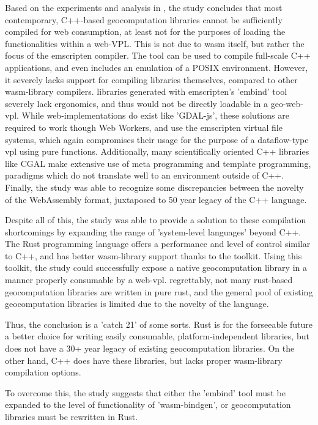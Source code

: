 Based on the experiments and analysis in , the study concludes that most contemporary, C++-based geocomputation libraries cannot be sufficiently compiled for web consumption, at least not for the purposes of loading the functionalities within a web-VPL.    
This is not due to wasm itself, but rather the focus of the emscripten compiler.
The tool can be used to compile full-scale C++ applications, and even includes an emulation of a POSIX environment.
However, it severely lacks support for compiling libraries themselves, compared to other wasm-library compilers.
libraries generated with emscripten's 'embind' tool severely lack ergonomics, and thus would not be directly loadable in a geo-web-vpl.
While web-implementations do exist like 'GDAL-js', these solutions are required to work though Web Workers, and use the emscripten virtual file systems, which again compromises their usage for the purpose of a dataflow-type vpl using pure functions.
Additionally, many scientifically oriented C++ libraries like CGAL make extensive use of meta programming and template programming, paradigms which do not translate well to an environment outside of C++. 
Finally, the study was able to recognize some discrepancies between the novelty of the WebAssembly format, juxtaposed to 50 year legacy of the C++ language.

Despite all of this, the study was able to provide a solution to these compilation shortcomings by expanding the range of 'system-level languages' beyond C++. 
The Rust programming language offers a performance and level of control similar to C++, and has better wasm-library support thanks to the  toolkit. 
Using this toolkit, the study could successfully expose a native geocomputation library in a manner properly consumable by a web-vpl.
regrettably, not many rust-based geocomputation libraries are written in pure rust, and the general pool of existing geocomputation libraries is limited due to the novelty of the language. 

Thus, the conclusion is a 'catch 21' of some sorts.
Rust is for the forseeable future a better choice for writing easily consumable, platform-independent libraries, but does not have a 30+ year legacy of existing geocomputation libraries. 
On the other hand, C++ does have these libraries, but lacks proper wasm-library compilation options.

To overcome this, the study suggests that either the 'embind' tool must be expanded to the level of functionality of  'wasm-bindgen', or geocomputation libraries must be rewritten in Rust. 

